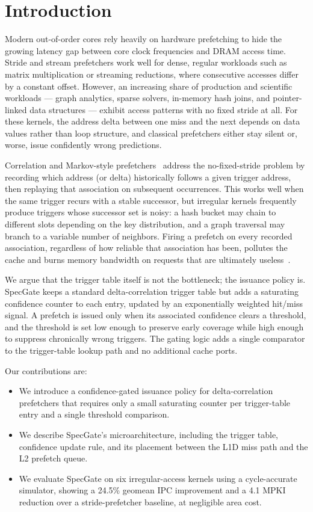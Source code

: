 \section{Introduction}
Modern out-of-order cores rely heavily on hardware prefetching to hide the growing latency gap between core clock frequencies and DRAM access time. Stride and stream prefetchers work well for dense, regular workloads such as matrix multiplication or streaming reductions, where consecutive accesses differ by a constant offset. However, an increasing share of production and scientific workloads --- graph analytics, sparse solvers, in-memory hash joins, and pointer-linked data structures --- exhibit access patterns with no fixed stride at all. For these kernels, the address delta between one miss and the next depends on data values rather than loop structure, and classical prefetchers either stay silent or, worse, issue confidently wrong predictions.

Correlation and Markov-style prefetchers~\cite{markov1997,ptt2017} address the no-fixed-stride problem by recording which address (or delta) historically follows a given trigger address, then replaying that association on subsequent occurrences. This works well when the same trigger recurs with a stable successor, but irregular kernels frequently produce triggers whose successor set is noisy: a hash bucket may chain to different slots depending on the key distribution, and a graph traversal may branch to a variable number of neighbors. Firing a prefetch on every recorded association, regardless of how reliable that association has been, pollutes the cache and burns memory bandwidth on requests that are ultimately useless~\cite{pollution2015}.

We argue that the trigger table itself is not the bottleneck; the issuance policy is. SpecGate keeps a standard delta-correlation trigger table but adds a saturating confidence counter to each entry, updated by an exponentially weighted hit/miss signal. A prefetch is issued only when its associated confidence clears a threshold, and the threshold is set low enough to preserve early coverage while high enough to suppress chronically wrong triggers. The gating logic adds a single comparator to the trigger-table lookup path and no additional cache ports.

Our contributions are:
\begin{itemize}
  \item We introduce a confidence-gated issuance policy for delta-correlation prefetchers that requires only a small saturating counter per trigger-table entry and a single threshold comparison.
  \item We describe SpecGate's microarchitecture, including the trigger table, confidence update rule, and its placement between the L1D miss path and the L2 prefetch queue.
  \item We evaluate SpecGate on six irregular-access kernels using a cycle-accurate simulator, showing a 24.5\% geomean IPC improvement and a 4.1 MPKI reduction over a stride-prefetcher baseline, at negligible area cost.
\end{itemize}
